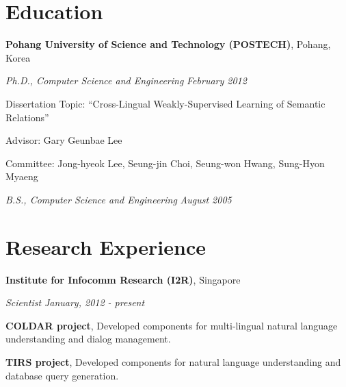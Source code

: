 \documentclass[margin,line]{res}
\newenvironment{list1}{
  \begin{list}{\ding{113}}{%
      \setlength{\itemsep}{0in}
      \setlength{\parsep}{0in} \setlength{\parskip}{0in}
      \setlength{\topsep}{0in} \setlength{\partopsep}{0in}
      \setlength{\leftmargin}{0.17in}}}{\end{list}}
\begin{document}
\begin{resume}
\section{\sc Education}
{\bf Pohang University of Science and Technology (POSTECH)}, Pohang, Korea\\
\vspace*{-.3cm}
\begin{list1}
\item[] {\em Ph.D., Computer Science and Engineering} \hfill {\em February 2012}\\
  \vspace*{-.3cm}
  \begin{list1}
  \item [] Dissertation Topic:  ``Cross-Lingual Weakly-Supervised Learning of Semantic Relations''
  \item [] Advisor:  Gary Geunbae Lee
  \item [] Committee: Jong-hyeok Lee, Seung-jin Choi, Seung-won Hwang, Sung-Hyon Myaeng
  \end{list1}
  \vspace*{.3cm}
\item[] {\em B.S., Computer Science and Engineering} \hfill {\em August 2005}\\
  \vspace*{-.3cm}
\end{list1}


\section{\sc Research Experience}
{\bf Institute for Infocomm Research (I2R)}, Singapore\\
\vspace{-.3cm}
\begin{list1}
\item[] {\em Scientist} \hfill {\em January, 2012 - present}\\
  \vspace{-.3cm}
  \begin{list1}
  \item[] {\bf COLDAR project}, Developed components for multi-lingual natural language understanding and dialog management.
  \item[] {\bf TIRS project}, Developed components for natural language understanding and database query generation.
  \end{list1}
\end{list1}


\end{resume}
\end{document}
